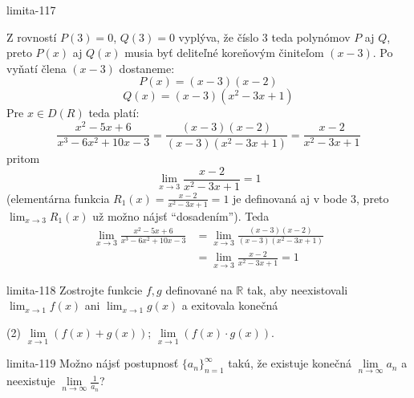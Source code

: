 \begin{defproblem}{limita-117}
\begin{solution}
    Z rovností $P(3) = 0$, $Q(3) = 0$ vyplýva, že číslo $3$ teda polynómov $P$
    aj $Q$, preto $P(x)$ aj $Q(x)$ musia byť deliteľné koreňovým činiteľom $(x -
    3)$. Po vyňatí člena $(x - 3)$ dostaneme:
    \[
        P(x)=(x - 3)(x - 2)
    \]
    \[
        Q(x)=(x - 3)(x^2 - 3x + 1)
    \]
    Pre $x \in D(R)$ teda platí:
    \[
        \frac{x^2 - 5x + 6}{x^3 - 6x^2 + 10x - 3}
            = \frac{(x - 3)(x - 2)}{(x - 3)(x^2 - 3x + 1)}
            = \frac{x-2}{x^2-3x+1}
    \]
    pritom
    \[
        \lim\limits_{x \to 3} \frac{x - 2}{x^2 - 3x + 1}=1
    \]
    (elementárna funkcia $R_1(x) = \frac{x - 2}{x^2 - 3x + 1}=1$ je
    definovaná aj v bode $3$, preto $\lim_{x \to 3} R_1(x)$ už možno
    nájsť ``dosadením''). Teda
    \begin{align*}
        \lim_{x \to 3} \frac{x^2 - 5x + 6}{x^3 - 6x^2 + 10x - 3}
        &= \lim_{x \to 3} \frac{(x - 3)(x - 2)}{(x - 3)(x^2 - 3x + 1)} \\
        &= \lim_{x \to 3} \frac{x - 2}{x^2 - 3x + 1} = 1
    \end{align*}
\end{solution}
\end{defproblem}

\begin{defproblem}{limita-118}
Zostrojte funkcie $f,g$ definované na $\mathbb{R}$ tak, aby neexistovali
$\lim_{x \to 1} f(x)$ ani $\lim_{x \to 1} g(x)$ a exitovala
konečná
\begin{tasks}(2)
    \task $\lim\limits_{{x \to 1}} (f(x)+g(x))$;
    \task $\lim\limits_{{x \to 1}} (f(x) \cdot g(x))$.
\end{tasks}
\end{defproblem}

\begin{defproblem}{limita-119}
Možno nájsť postupnosť ${\{a_n\}}_{n=1}^\infty$ takú, že existuje konečná
$\lim\limits_{n \to \infty} a_n$ a neexistuje $\lim\limits_{n \to \infty}
\frac{1}{a_n}$?
\end{defproblem}

